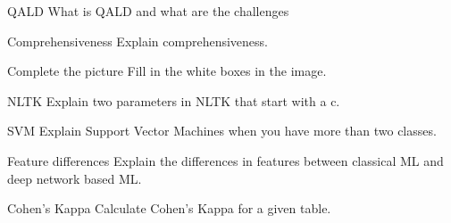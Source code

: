 \documentclass{article}
\begin{document}
\begin{exercise}{QALD}
  What is QALD and what are the challenges

  \begin{solution}
  \end{solution}
\end{exercise}


\setcounter{section}{2020}

\begin{exercise}{Comprehensiveness}
  Explain comprehensiveness.

  \begin{solution}
  \end{solution}
\end{exercise}

\begin{exercise}{Complete the picture}
  Fill in the white boxes in the image.


  \begin{solution}
  \end{solution}
\end{exercise}

\begin{exercise}{NLTK}
  Explain two parameters in NLTK that start with a c.

  \begin{solution}
  \end{solution}
\end{exercise}

\begin{exercise}{SVM}
  Explain Support Vector Machines when you have more than two classes.

  \begin{solution}
  \end{solution}
\end{exercise}

\begin{exercise}{Feature differences}
  Explain the differences in features between classical ML and deep network based ML.

  \begin{solution}
  \end{solution}
\end{exercise}

\begin{exercise}{Cohen's Kappa}
  Calculate Cohen's Kappa for a given table.

  \begin{solution}
  \end{solution}
\end{exercise}
\end{document}
